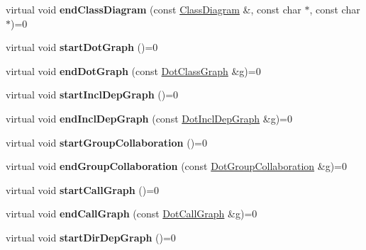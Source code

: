 \begin{DoxyCompactItemize}
virtual void {\bfseries end\+Class\+Diagram} (const \mbox{\hyperlink{class_class_diagram}{Class\+Diagram}} \&, const char $\ast$, const char $\ast$)=0
\item 
\mbox{\label{class_output_generator_a60efbd7467b31058030731fe084a9db5}} 
virtual void {\bfseries start\+Dot\+Graph} ()=0
\item 
\mbox{\label{class_output_generator_a3b268fc536acaca12748c9a729bd4a0b}} 
virtual void {\bfseries end\+Dot\+Graph} (const \mbox{\hyperlink{class_dot_class_graph}{Dot\+Class\+Graph}} \&g)=0
\item 
\mbox{\label{class_output_generator_a8f015b38b836904858cc1cd34f44363f}} 
virtual void {\bfseries start\+Incl\+Dep\+Graph} ()=0
\item 
\mbox{\label{class_output_generator_a4bae4acba787ae56c9851ff5651ecff4}} 
virtual void {\bfseries end\+Incl\+Dep\+Graph} (const \mbox{\hyperlink{class_dot_incl_dep_graph}{Dot\+Incl\+Dep\+Graph}} \&g)=0
\item 
\mbox{\label{class_output_generator_a5c001113ef669b2043a9abbf1326f286}} 
virtual void {\bfseries start\+Group\+Collaboration} ()=0
\item 
\mbox{\label{class_output_generator_ae0b99fc498e233c94240869ec423cb54}} 
virtual void {\bfseries end\+Group\+Collaboration} (const \mbox{\hyperlink{class_dot_group_collaboration}{Dot\+Group\+Collaboration}} \&g)=0
\item 
\mbox{\label{class_output_generator_ace8e9a8d3c193fe5b50f19d07882a51a}} 
virtual void {\bfseries start\+Call\+Graph} ()=0
\item 
\mbox{\label{class_output_generator_a8e13dc9a74d4a508a314d328c9ee5841}} 
virtual void {\bfseries end\+Call\+Graph} (const \mbox{\hyperlink{class_dot_call_graph}{Dot\+Call\+Graph}} \&g)=0
\item 
\mbox{\label{class_output_generator_a02c3701bf94326612c1b4fcaf16c4011}} 
virtual void {\bfseries start\+Dir\+Dep\+Graph} ()=0

\end{DoxyCompactItemize}
